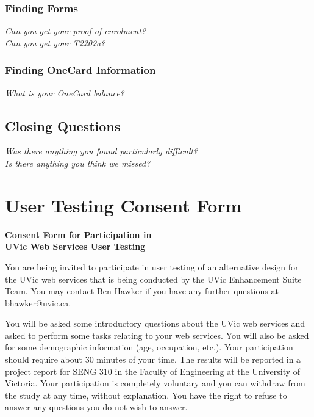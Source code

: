 \documentclass{article}
\begin{document}
\begin{appendices}
\subsubsection*{Finding Forms}\label{finding-forms}
\emph{Can you get your proof of enrolment?} \\
\emph{Can you get your T2202a?} \\
\subsubsection*{Finding OneCard Information}\label{finding-onecard-information}
\emph{What is your OneCard balance?} \\
\subsection*{Closing Questions}\label{closing-questions}
\emph{Was there anything you found particularly difficult?} \\
\emph{Is there anything you think we missed?} \\

\pagebreak

\section{User Testing Consent Form}\label{ap:ut-consent}

\begin{center}
    \textbf{Consent Form for Participation in \\ UVic Web Services User Testing}
\end{center}

You are being invited to participate in user testing of an alternative design for the UVic web services that is being conducted by the UVic Enhancement Suite Team.  You may contact Ben Hawker if you have any further questions at bhawker@uvic.ca.
 
You will be asked some introductory questions about the UVic web services and asked to perform some tasks relating to your web services.  You will also be asked for some demographic information (age, occupation, etc.).  Your participation should require about 30 minutes of your time.  The results will be reported in a project report for SENG 310 in the Faculty of Engineering at the University of Victoria.
Your participation is completely voluntary and you can withdraw from the study at any time, without explanation.  You have the right to refuse to answer any questions you do not wish to answer.


\end{appendices}
\end{document}
